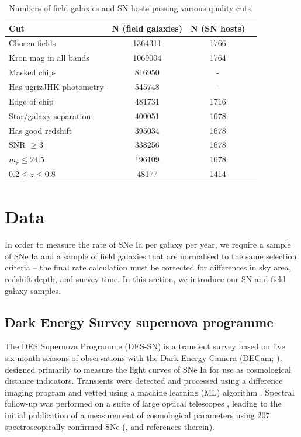 \documentclass[fleqn,usenatbib]{mnras}
\begin{document}
\begin{table}
	\centering
	\caption{Numbers of field galaxies and SN hosts passing various quality cuts.}
	\label{tab:cuts}
	\begin{tabular}{lccr} %
		\hline
		Cut & N (field galaxies)  & N (SN hosts)\\
		\hline
		Chosen fields & 1364311  & 1766\\
	    Kron mag in all bands & 1069004  & 1764 \\
	    Masked chips & 816950  & - \\
	    Has ugrizJHK photometry & 545748  & -\\
	    Edge of chip & 481731 & 1716 \\
	    Star/galaxy separation & 400051 &  1678\\
	    Has good redshift & 395034 & 1678 \\
	    SNR $\geq 3$& 338256  & 1678 \\
	    $m_r \leq 24.5$ & 196109 &  1678 \\
	    $0.2 \leq z \leq 0.8$ & 48177 & 1414\\ 
	    
		\hline
	\end{tabular}
\end{table}

\section{Data}

In order to measure the rate of SNe Ia per galaxy per year, we require a sample of SNe Ia and a sample of field galaxies that are normalised to the same selection criteria -- the final rate calculation must be corrected for differences in sky area, redshift depth, and survey time. In this section, we introduce our SN and field galaxy samples.


\label{sec:data}
\subsection{Dark Energy Survey supernova programme \label{subsec:des}}
The DES Supernova Programme (DES-SN) is a transient survey based on five six-month seasons of observations with the Dark Energy Camera (DECam; \citealt{Flaugher2015}), designed primarily to measure the light curves of SNe Ia for use as cosmological distance indicators. Transients were detected and processed using a difference imaging program \citep{Kessler2015} and vetted using a machine learning (ML) algorithm \citep{Goldstein2015}. Spectral follow-up was performed on a suite of large optical telescopes \citet{Smith2020a}, leading to the initial publication of a measurement of cosmological parameters using 207 spectroscopically confirmed SNe (\citealt{DESCollaboration2018a}, and references therein). 
\end{document}
